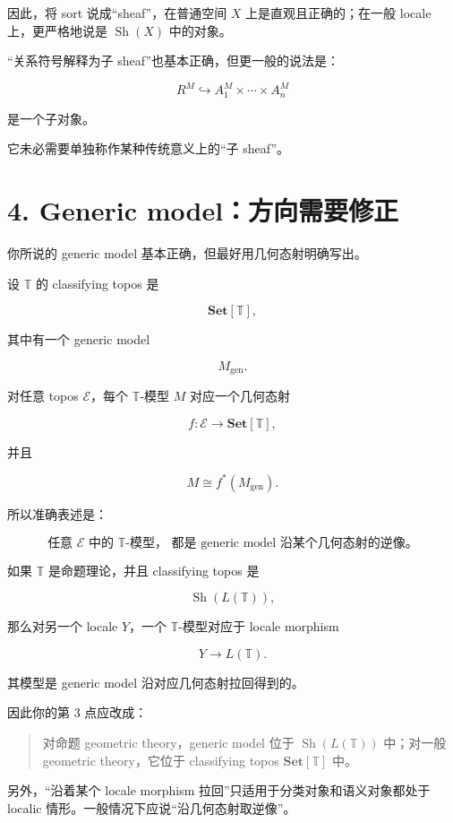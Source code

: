 \documentclass{ctexart}
\begin{document}
因此，将 sort 说成``sheaf''，在普通空间 \(X\) 上是直观且正确的；在一般 locale 上，更严格地说是 \(\operatorname{Sh}(X)\) 中的对象。

``关系符号解释为子 sheaf''也基本正确，但更一般的说法是：

\[
R^M\hookrightarrow
A_1^M\times\cdots\times A_n^M
\]

是一个子对象。

它未必需要单独称作某种传统意义上的``子 sheaf''。

\section*{4. Generic model：方向需要修正}

你所说的 generic model 基本正确，但最好用几何态射明确写出。

设 \(\mathbb T\) 的 classifying topos 是

\[
\mathbf{Set}[\mathbb T],
\]

其中有一个 generic model

\[
M_{\mathrm{gen}}.
\]

对任意 topos \(\mathcal E\)，每个 \(\mathbb T\)-模型 \(M\) 对应一个几何态射

\[
f:\mathcal E\to\mathbf{Set}[\mathbb T],
\]

并且

\[
M\cong f^\ast(M_{\mathrm{gen}}).
\]

所以准确表述是：

\[
\boxed{
\text{任意 \(\mathcal E\) 中的 \(\mathbb T\)-模型，
都是 generic model 沿某个几何态射的逆像。}
}
\]

如果 \(\mathbb T\) 是命题理论，并且 classifying topos 是

\[
\operatorname{Sh}(L(\mathbb T)),
\]

那么对另一个 locale \(Y\)，一个 \(\mathbb T\)-模型对应于 locale morphism

\[
Y\to L(\mathbb T).
\]

其模型是 generic model 沿对应几何态射拉回得到的。

因此你的第 3 点应改成：

\begin{quote}
对命题 geometric theory，generic model 位于 \(\operatorname{Sh}(L(\mathbb T))\) 中；对一般 geometric theory，它位于 classifying topos \(\mathbf{Set}[\mathbb T]\) 中。
\end{quote}

另外，``沿着某个 locale morphism 拉回''只适用于分类对象和语义对象都处于 localic 情形。一般情况下应说``沿几何态射取逆像''。
\end{document}
